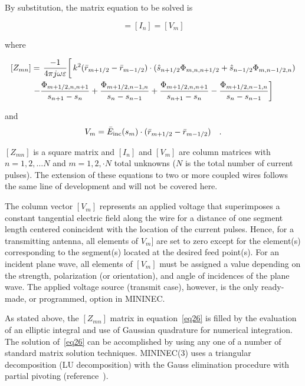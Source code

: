 \documentclass[12pt]{article}
\begin{document}
By substitution, the matrix equation to be solved is

\begin{equation}
[Z_{mn}] = [I_n] = [V_m]
\label{eq26}
\end{equation}

where

\begin{equation}
\begin{gathered}
[Z_{mn}] = \left.\frac{-1}{4\pi j\omega\varepsilon}\right[
k^2(\vect{r}_{m+1/2} - \vect{r}_{m-1/2}) \cdot
(\hat{s}_{n+1/2}\Phi_{m,n,n+1/2} + \hat{s}_{n-1/2}\Phi_{m,n-1/2,n}) \\
\left.
-\frac{\Phi_{m+1/2,n,n+1}}{s_{n+1}-s_n}+\frac{\Phi_{m+1/2,n-1,n}}{s_n-s_{n-1}}
+\frac{\Phi_{m+1/2,n,n+1}}{s_{n+1}-s_n}-\frac{\Phi_{m+1/2,n-1,n}}{s_n-s_{n-1}}
\right]\\
\end{gathered}
\label{eq27}
\end{equation}

and
\begin{equation}
V_m = \bar{E}_{\mathrm{inc}}(s_m)\cdot(\bar{r}_{m+1/2}-\bar{r}_{m-1/2})
\quad.
\label{eq28}
\end{equation}

$[Z_{mn}]$ is a square matrix and $[I_n]$ and $[V_m]$ are column
matrices with $n=1,2,\ldots N$ and $m=1,2,\cdot N$ total unknowns ($N$ is
the total number of current pulses). The extension of these equations to
two or more coupled wires follows the same line of development and will
not be covered here.

The column vector $[V_m]$ represents an applied voltage that
superimposes a constant tangential electric field along the wire for a
distance of one segment length centered conincident with the location of
the current pulses. Hence, for a transmitting antenna, all elements of
$V_m]$ are set to zero except for the element(s) corresponding to the
segment(s) located at the desired feed point(s). For an incident plane
wave, all elements of $[V_m]$ must be assigned a value depending on the
strength, polarization (or orientation), and angle of incidences of the
plane wave. The applied voltage source (transmit case), however, is the
only ready-made, or programmed, option in MININEC.

As stated above, the $[Z_{mn}]$ matrix in equation~\eqref{eq26} is
filled by the evaluation of an elliptic integral and use of Gaussian
quadrature for numerical integration. The solution of~\eqref{eq26} can
be accomplished by using any one of a number of standard matrix solution
techniques. MININEC(3) uses a triangular decomposition (LU
decomposition) with the Gauss elimination procedure with partial
pivoting (reference~\cite{r7}).
\end{document}
